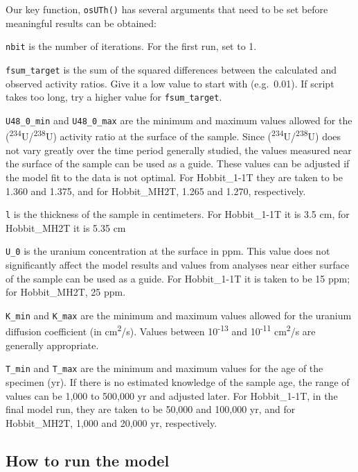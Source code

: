 \documentclass[]{elsarticle} %
\begin{document}
Our key function, \texttt{osUTh()} has several arguments that need to be set before meaningful results can be obtained:

\texttt{nbit} is the number of iterations. For the first run, set to 1.

\texttt{fsum\_target} is the sum of the squared differences between the calculated and observed activity ratios. Give it a low value to start with (e.g.~0.01). If script takes too long, try a higher value for \texttt{fsum\_target}.

\texttt{U48\_0\_min} and \texttt{U48\_0\_max} are the minimum and maximum values allowed for the (\textsuperscript{234}U/\textsuperscript{238}U) activity ratio at the surface of the sample. Since (\textsuperscript{234}U/\textsuperscript{238}U) does not vary greatly over the time period generally studied, the values measured near the surface of the sample can be used as a guide. These values can be adjusted if the model fit to the data is not optimal. For Hobbit\_1-1T they are taken to be 1.360 and 1.375, and for Hobbit\_MH2T, 1.265 and 1.270, respectively.

\texttt{l} is the thickness of the sample in centimeters. For Hobbit\_1-1T it is 3.5 cm, for Hobbit\_MH2T it is 5.35 cm

\texttt{U\_0} is the uranium concentration at the surface in ppm. This value does not significantly affect the model results and values from analyses near either surface of the sample can be used as a guide. For Hobbit\_1-1T it is taken to be 15 ppm; for Hobbit\_MH2T, 25 ppm.

\texttt{K\_min} and \texttt{K\_max} are the minimum and maximum values allowed for the uranium diffusion coefficient (in cm\textsuperscript{2}/s). Values between 10\textsuperscript{-13} and 10\textsuperscript{-11} cm\textsuperscript{2}/s are generally appropriate.

\texttt{T\_min} and \texttt{T\_max} are the minimum and maximum values for the age of the specimen (yr). If there is no estimated knowledge of the sample age, the range of values can be 1,000 to 500,000 yr and adjusted later. For Hobbit\_1-1T, in the final model run, they are taken to be 50,000 and 100,000 yr, and for Hobbit\_MH2T, 1,000 and 20,000 yr, respectively.

\hypertarget{how-to-run-the-model-1}{%
\subsection{How to run the model}\label{how-to-run-the-model-1}}
\end{document}
